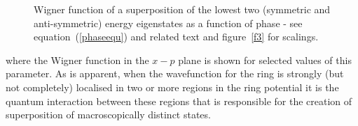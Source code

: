 \documentclass[12pt,a4paper,superscriptaddress,showpacs,floatfix,pra]{revtex4-2}
\begin{document}
\begin{figure}[!t]
\begin{center}
\end{center}
\caption{Wigner  function  of  a   superposition  of  the  lowest  two
(symmetric  and anti-symmetric)  energy eigenstates  as a  function of
phase  - see  equation~(\protect\ref{phaseequ}) and  related  text and
figure~\ref{f3} for scalings. }
\label{f4}
\end{figure}
where the  Wigner function  in the $x-p$  plane is shown  for selected
values of  this parameter. As  is apparent, when the  wavefunction for
the ring  is strongly  (but not completely)  localised in two  or more
regions in  the ring potential  it is the quantum  interaction between
these  regions  that  is  responsible  for  the  creation  of superposition of macroscopically distinct states.
\end{document}
